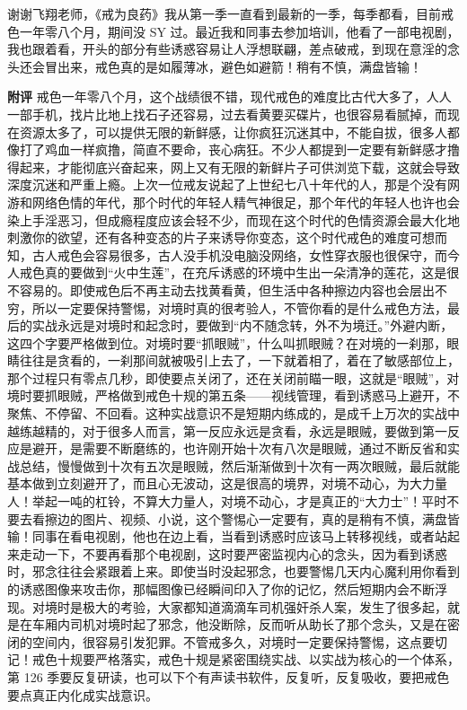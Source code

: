 \begin{case}
    谢谢飞翔老师，《戒为良药》我从第一季一直看到最新的一季，每季都看，目前戒色一年零八个月，期间没 SY 过。最近我和同事去参加培训，他看了一部电视剧，我也跟着看，开头的部分有些诱惑容易让人浮想联翩，差点破戒，到现在意淫的念头还会冒出来，戒色真的是如履薄冰，避色如避箭！稍有不慎，满盘皆输！

    \textbf{附评} 戒色一年零八个月，这个战绩很不错，现代戒色的难度比古代大多了，人人一部手机，找片比地上找石子还容易，过去看黄要买碟片，也很容易看腻掉，而现在资源太多了，可以提供无限的新鲜感，让你疯狂沉迷其中，不能自拔，很多人都像打了鸡血一样疯撸，简直不要命，丧心病狂。不少人都提到一定要有新鲜感才撸得起来，才能彻底兴奋起来，网上又有无限的新鲜片子可供浏览下载，这就会导致深度沉迷和严重上瘾。上次一位戒友说起了上世纪七八十年代的人，那是个没有网游和网络色情的年代，那个时代的年轻人精气神很足，那个年代的年轻人也许也会染上手淫恶习，但成瘾程度应该会轻不少，而现在这个时代的色情资源会最大化地刺激你的欲望，还有各种变态的片子来诱导你变态，这个时代戒色的难度可想而知，古人戒色会容易很多，古人没手机没电脑没网络，女性穿衣服也很保守，而今人戒色真的要做到“火中生莲”，在充斥诱惑的环境中生出一朵清净的莲花，这是很不容易的。即使戒色后不再主动去找黄看黄，但生活中各种擦边内容也会层出不穷，所以一定要保持警惕，对境时真的很考验人，不管你看的是什么戒色方法，最后的实战永远是对境时和起念时，要做到“内不随念转，外不为境迁。”外避内断，这四个字要严格做到位。对境时要“抓眼贼”，什么叫抓眼贼？在对境的一刹那，眼睛往往是贪看的，一刹那间就被吸引上去了，一下就着相了，着在了敏感部位上，那个过程只有零点几秒，即使要点关闭了，还在关闭前瞄一眼，这就是“眼贼”，对境时要抓眼贼，严格做到戒色十规的第五条——视线管理，看到诱惑马上避开，不聚焦、不停留、不回看。这种实战意识不是短期内练成的，是成千上万次的实战中越练越精的，对于很多人而言，第一反应永远是贪看，永远是眼贼，要做到第一反应是避开，是需要不断磨练的，也许刚开始十次有八次是眼贼，通过不断反省和实战总结，慢慢做到十次有五次是眼贼，然后渐渐做到十次有一两次眼贼，最后就能基本做到立刻避开了，而且心无波动，这是很高的境界，对境不动心，为大力量人！举起一吨的杠铃，不算大力量人，对境不动心，才是真正的“大力士”！平时不要去看擦边的图片、视频、小说，这个警惕心一定要有，真的是稍有不慎，满盘皆输！同事在看电视剧，他也在边上看，当看到诱惑时应该马上转移视线，或者站起来走动一下，不要再看那个电视剧，这时要严密监视内心的念头，因为看到诱惑时，邪念往往会紧跟着上来。即使当时没起邪念，也要警惕几天内心魔利用你看到的诱惑图像来攻击你，那幅图像已经瞬间印入了你的记忆，然后短期内会不断浮现。对境时是极大的考验，大家都知道滴滴车司机强奸杀人案，发生了很多起，就是在车厢内司机对境时起了邪念，他没断除，反而听从助长了那个念头，又是在密闭的空间内，很容易引发犯罪。不管戒多久，对境时一定要保持警惕，这点要切记！戒色十规要严格落实，戒色十规是紧密围绕实战、以实战为核心的一个体系，第 126 季要反复研读，也可以下个有声读书软件，反复听，反复吸收，要把戒色要点真正内化成实战意识。
\end{case}

